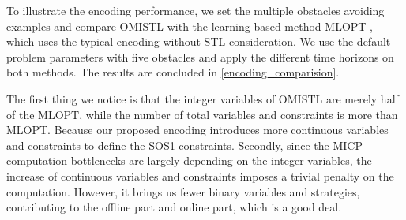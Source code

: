 \documentclass[a4paper]{report}
\begin{document}
To illustrate the encoding performance, we set the multiple obstacles avoiding examples and compare OMISTL with the learning-based method MLOPT \cite[]{bertsimas2022online}, which uses the typical encoding without STL consideration. We use the default problem parameters with five obstacles and apply the different time horizons on both methods. The results are concluded in \ref{encoding_comparision}. 

The first thing we notice is that the integer variables of OMISTL are merely half of the MLOPT, while the number of total variables and constraints is more than MLOPT. Because our proposed encoding introduces more continuous variables and constraints to define the SOS1 constraints. Secondly, since the MICP computation bottlenecks are largely depending on the integer variables, the increase of continuous variables and constraints imposes a trivial penalty on the computation. However, it brings us fewer binary variables and strategies, contributing to the offline part and online part, which is a good deal.

\begin{table}[]
    \begin{center}
    \end{center}
\caption[]{Encoding comparison in different horizons}
\label{encoding_comparision}
\end{table}
\end{document}
